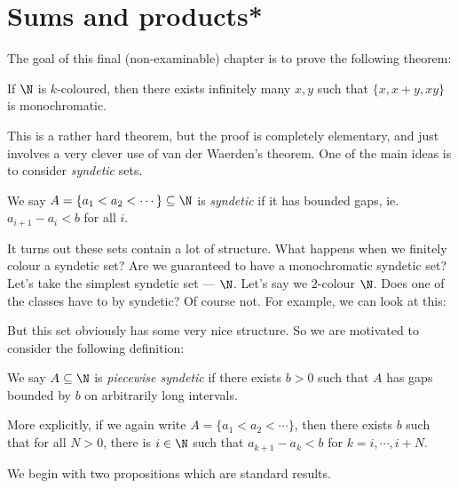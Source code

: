 \documentclass[a4paper]{article}
\begin{document}
\section{Sums and products*}
The goal of this final (non-examinable) chapter is to prove the following theorem:
\begin{thm}[Moreira, 2016]
  If $\N$ is $k$-coloured, then there exists infinitely many $x, y$ such that $\{x, x + y, xy\}$ is monochromatic.
\end{thm}
This is a rather hard theorem, but the proof is completely elementary, and just involves a very clever use of van der Waerden's theorem. One of the main ideas is to consider \emph{syndetic} sets.
\begin{defi}
  We say $A = \{a_1 < a_2 < \cdots\} \subseteq \N$ is \emph{syndetic} if it has bounded gaps, ie. $a_{i + 1} - a_i < b$ for all $i$.
\end{defi}

It turns out these sets contain a lot of structure. What happens when we finitely colour a syndetic set? Are we guaranteed to have a monochromatic syndetic set? Let's take the simplest syndetic set --- $\N$. Let's say we $2$-colour $\N$. Does one of the classes have to by syndetic? Of course not. For example, we can look at this:
\begin{center}
\end{center}
But this set obviously has some very nice structure. So we are motivated to consider the following definition:
\begin{defi}
  We say $A \subseteq \N$ is \emph{piecewise syndetic} if there exists $b > 0$ such that $A$ has gaps bounded by $b$ on arbitrarily long intervals.

  More explicitly, if we again write $A = \{a_1 < a_2 < \cdots\}$, then there exists $b$ such that for all $N > 0$, there is $i \in \N$ such that $a_{k + 1} - a_k < b$ for $k = i, \cdots, i + N$.
\end{defi}
We begin with two propositions which are standard results.
\end{document}
